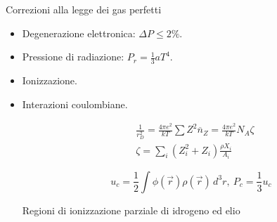 \begin{frame}{Correzioni alla legge dei gas perfetti}

\begin{itemize}
\item Degenerazione elettronica: $\Delta P\leq2\%$.

\item Pressione di radiazione: $P_r=\frac{1}{3}aT^4$.

\item Ionizzazione.

\item Interazioni coulombiane.

\begin{align}
&\frac{1}{r_D^2}=\frac{4\pi e^2}{kT}\sum Z^2\overline{n}_Z=\frac{4\pi e^2}{kT}N_A\zeta\label{eq:debyeradius}\\
&\zeta=\sum_{i}(Z_i^2+Z_i)\frac{\rho X_i}{A_i}
\end{align}

\begin{equation}
u_c=\frac{1}{2}\int\phi(\vec{r})\rho(\vec{r})\,d^3r,\ P_c=\frac{1}{3}u_c
\end{equation}

Regioni di ionizzazione parziale di idrogeno ed elio

\end{itemize}

\end{frame}

